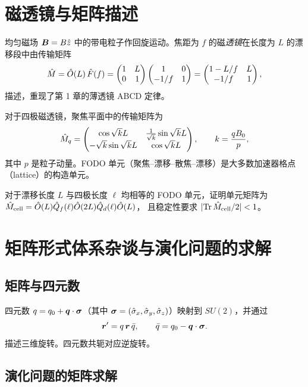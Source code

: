 \section{磁透镜与矩阵描述}

均匀磁场 $\bm{B} = B\hat z$ 中的带电粒子作回旋运动。焦距为 $f$ 的磁\emph{透镜}在长度为 $L$ 的漂移段中由传输矩阵
\begin{equation}
\hat M = \hat O(L)\,\hat F(f) =
\begin{pmatrix}1&L\\0&1\end{pmatrix}\begin{pmatrix}1&0\\-1/f&1\end{pmatrix}
= \begin{pmatrix}1-L/f & L \\ -1/f & 1\end{pmatrix},
\label{eq:5.2.1}
\end{equation}
描述，重现了第 1 章的薄透镜 ABCD 定律。

对于四极磁透镜，聚焦平面中的传输矩阵为
\begin{equation}
\hat M_q = \begin{pmatrix}\cos\sqrt{k}L & \frac{1}{\sqrt{k}}\sin\sqrt{k}L
           \\ -\sqrt{k}\sin\sqrt{k}L & \cos\sqrt{k}L\end{pmatrix},
\qquad k = \frac{qB_0}{p},
\label{eq:5.2.2}
\end{equation}
其中 $p$ 是粒子动量。FODO 单元（聚焦--漂移--散焦--漂移）是大多数加速器格点（lattice）的构造单元。

\begin{exercise}
对于漂移长度 $L$ 与四极长度 $\ell$ 均相等的 FODO 单元，证明单元矩阵为
$\hat M_{\rm cell}=\hat O(L)\hat Q_f(\ell)\hat O(2L)\hat Q_d(\ell)\hat O(L)$，
且稳定性要求 $|{\rm Tr}\,\hat M_{\rm cell}/2|<1$。
\end{exercise}

\section{矩阵形式体系杂谈与演化问题的求解}

\subsection{矩阵与四元数}

四元数 $q=q_0+\bm{q}\cdot\bm{\sigma}$（其中 $\bm{\sigma}=(\hat\sigma_x,\hat\sigma_y,\hat\sigma_z)$）映射到 $SU(2)$，并通过
\begin{equation}
\bm{r}' = q\,\bm{r}\,\bar q, \qquad \bar q = q_0 - \bm{q}\cdot\bm{\sigma}.
\label{eq:5.3.1}
\end{equation}
描述三维旋转。四元数共轭对应逆旋转。

\subsection{演化问题的矩阵求解}

